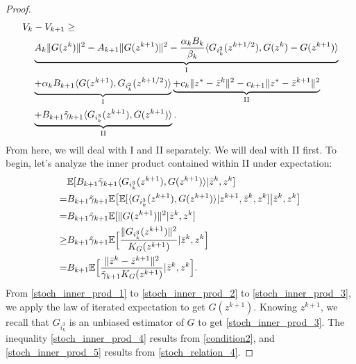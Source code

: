 \documentclass[11pt,reqno,oneside]{amsart}
\theoremstyle{definition}
\numberwithin{equation}{section}
\begin{document}
\begin{proof}
\begin{align*}
        V_{k}& - V_{k+1} \geq \\
        & \underbrace{A_{k}\|G(z^{k})\|^{2} - A_{k+1}\|G(z^{k+1})\|^{2} - \frac{\alpha_{k}B_{k}}{\beta_{k}}\langle G_{i_{k}^{2}}(z^{k+1/2}), G(z^{k}) - G(z^{k+1})\rangle}_{\text{I}} \\
        &\underbrace{+\alpha_{k}B_{k+1}\langle G(z^{k+1}),G_{i_{k}^{2}}(z^{k+1/2}) \rangle}_{\text{I}}
        \underbrace{+ c_{k}\|z^{*} - \bar{z}^{k}\|^{2} - c_{k+1}\|z^{*} - \bar{z}^{k+1}\|^{2}}_{\text{II}} \\
        &\underbrace{+B_{k+1}\Tilde{\gamma}_{k+1}\langle G_{i_{k}^{3}}(z^{k+1}), G(z^{k+1}) \rangle}_{\text{II}}. 
    \end{align*}
    From here, we will deal with I and II separately. 
    We will deal with II first.
    To begin, let's analyze the inner product contained within II under expectation:
    \begin{align}
        &\mathbb{E}[B_{k+1}\Tilde{\gamma}_{k+1}\langle G_{i_{k}^{3}}(z^{k+1}), G(z^{k+1}) \rangle|\bar{z}^{k}, z^{k}] \label{stoch_inner_prod_1} \\
        =&B_{k+1}\Tilde{\gamma}_{k+1}\mathbb{E}\big{[} \mathbb{E}[\langle G_{i_{k}^{3}}(z^{k+1}),G(z^{k+1})\rangle|z^{k+1},\bar{z}^{k},z^{k}]\big{|}\bar{z}^{k}, z^{k}\big{]} \label{stoch_inner_prod_2} \\
        =&B_{k+1}\Tilde{\gamma}_{k+1}\mathbb{E}[\|G(z^{k+1})\|^{2}|\bar{z}^{k},z^{k}] \label{stoch_inner_prod_3} \\
        \geq& B_{k+1}\Tilde{\gamma}_{k+1}\mathbb{E}\Big{[}\frac{\|G_{i_{k}^{3}}(z^{k+1})\|^{2}}{K_{G}(z^{k+1})}|\bar{z}^{k},z^{k}\Big{]} \label{stoch_inner_prod_4} \\
        =& B_{k+1}\mathbb{E}\Big{[}\frac{\|\bar{z}^{k} - \bar{z}^{k+1}\|^{2}}{\Tilde{\gamma}_{k+1}K_{G}(z^{k+1})}|\bar{z}^{k},z^{k}\Big{]}. \label{stoch_inner_prod_5}
    \end{align}
    From \eqref{stoch_inner_prod_1} to \eqref{stoch_inner_prod_2} to \eqref{stoch_inner_prod_3}, we apply the law of iterated expectation to get $G(z^{k+1})$.
    Knowing $z^{k+1}$, we recall that $G_{i_{k}^{3}}$ is an unbiased estimator of $G$ to get \eqref{stoch_inner_prod_3}.
    The inequality \eqref{stoch_inner_prod_4} results from \ref{condition2}, and \eqref{stoch_inner_prod_5} results from \eqref{stoch_relation_4}.


\end{proof}
\end{document}
